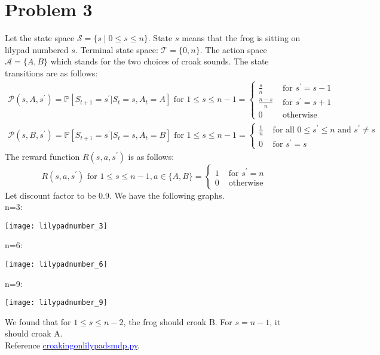 \documentclass{article}
\begin{document}
\section*{Problem 3}
Let the state space $\mathcal{S}=\{s \mid 0 \leq s \leq n\}$. State $s$ means that the frog is sitting on lilypad numbered $s$. Terminal state space: $\mathcal{T}=\{0, n\}.$ The action space $\mathcal{A}=\{A, B\}$ which stands for the two choices of croak sounds. The state transitions are as follows:
$$
\begin{gathered}
\mathcal{P}(s, A, s^{\prime}) = \mathbb{P}[S_{t+1} = s^{\prime}| S_{t} = s, A_{t} = A] \text { for } 1 \leq s \leq n-1= \begin{cases}\frac{s}{n} & \text { for } s^{\prime}=s-1 \\
\frac{n-s}{n} & \text { for } s^{\prime}=s+1 \\
0 & \text { otherwise }\end{cases} \\
\mathcal{P}(s, B, s^{\prime}) =  \mathbb{P}[S_{t+1} = s^{\prime}| S_{t} = s, A_{t} = B] \text { for } 1 \leq s \leq n-1= \begin{cases}\frac{1}{n} & \text { for all } 0 \leq s^{\prime} \leq n \text { and } s^{\prime} \neq s \\
0 & \text { for } s^{\prime}=s\end{cases}
\end{gathered}
$$
The reward function $R\left(s, a, s^{\prime}\right)$ is as follows:
$$
R\left(s, a, s^{\prime}\right) \text { for } 1 \leq s \leq n-1, a \in\{A, B\}= \begin{cases}1 & \text { for } s^{\prime}=n \\ 0 & \text { otherwise }\end{cases}
$$
Let discount factor to be 0.9. We have the following graphs.\\
n=3:
\begin{center}
\texttt{[image: lilypadnumber\_3]}
\end{center}
n=6:
\begin{center}
\texttt{[image: lilypadnumber\_6]}
\end{center}
n=9:
\begin{center}
\texttt{[image: lilypadnumber\_9]}
\end{center}
We found that for $1\leq s\leq n-2$, the frog should croak B. For $s=n-1$, it should croak A.\\
Reference \href{https://github.com/miaochin/RL-book/tree/master/CME241_assignments/assignment3}{\textcolor{blue}{croaking\textunderscore on\textunderscore lilypads\textunderscore mdp.py}}.
\end{document}
